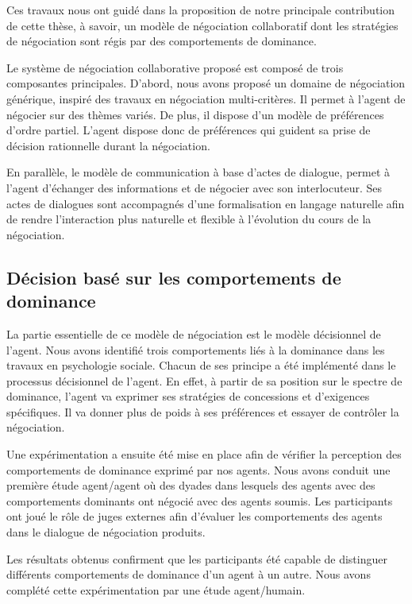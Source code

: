 	
	Ces travaux nous ont guidé dans la proposition de notre principale contribution de cette thèse, à savoir, un modèle de négociation collaboratif dont les stratégies de négociation sont régis par des comportements de dominance.
	
	Le système de négociation collaborative proposé est composé de trois composantes principales.
	D'abord, nous avons proposé un domaine de négociation générique, inspiré des travaux en négociation multi-critères. Il permet à l'agent de négocier sur des thèmes variés. De plus, il dispose d'un modèle de préférences d'ordre partiel. L'agent dispose donc de préférences qui guident sa prise de décision rationnelle durant la négociation.
	
	En parallèle, le modèle de communication à base d'actes de dialogue, permet à l'agent d'échanger des informations et de négocier avec son interlocuteur. Ses actes de dialogues sont accompagnés d'une formalisation en langage naturelle afin de rendre l'interaction plus naturelle et flexible à l'évolution du cours de la négociation.
	
	\subsection{Décision basé sur les comportements de dominance}
	 
	 La partie essentielle de ce modèle de négociation est le modèle décisionnel de l'agent. Nous avons identifié trois comportements liés à la dominance dans les travaux  en psychologie sociale. Chacun de ses principe a été implémenté dans le processus décisionnel de l'agent.
	 En effet, à partir de sa position sur le spectre de dominance, l'agent va exprimer ses stratégies de concessions et d'exigences spécifiques. Il va donner plus de poids à ses préférences et essayer de contrôler la négociation. 
	
	Une expérimentation a ensuite été mise en place afin de vérifier la perception des comportements de dominance exprimé par nos agents.
	Nous avons conduit une première étude agent/agent où des dyades dans lesquels des agents avec des comportements dominants ont négocié avec des agents soumis. Les participants ont joué le rôle de juges externes afin d'évaluer les comportements des agents dans le dialogue de négociation produits. 

	Les résultats obtenus confirment que les participants été capable de distinguer différents comportements de dominance d'un agent à un autre. Nous avons complété cette expérimentation par une étude agent/humain. 
	
